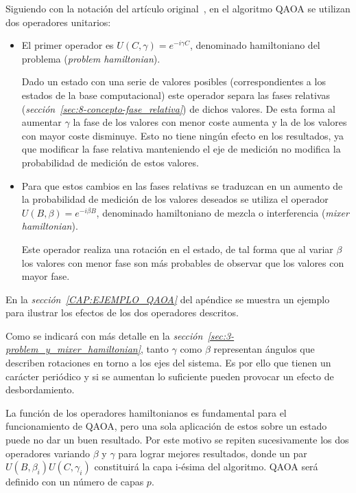 Siguiendo con la notación del artículo original~\cite{qaoa_paper_original}, en el algoritmo QAOA se utilizan dos operadores unitarios:
\begin{itemize}
\item El primer operador es $U(C, \gamma) = e^{-i \gamma C}$, denominado hamiltoniano del problema (\textit{problem hamiltonian}).

  Dado un estado con una serie de valores posibles (correspondientes a los estados de la base computacional) este operador separa las fases relativas (\textit{sección~\ref{sec:8-concepto-fase_relativa}}) de dichos valores.
  De esta forma al aumentar $\gamma$ la fase de los valores con menor coste aumenta y la de los valores con mayor coste disminuye.
  Esto no tiene ningún efecto en los resultados, ya que modificar la fase relativa manteniendo el eje de medición no modifica la probabilidad de medición de estos valores.

\item Para que estos cambios en las fases relativas se traduzcan en un aumento de la probabilidad de medición de los valores deseados se utiliza el operador $U(B, \beta) = e^{-i \beta B}$, denominado hamiltoniano de mezcla o interferencia (\textit{mixer hamiltonian}).

  Este operador realiza una rotación en el estado, de tal forma que al variar $\beta$ los valores con menor fase son más probables de observar que los valores con mayor fase.

\end{itemize}

En la \textit{sección~\ref{CAP:EJEMPLO_QAOA}} del apéndice se muestra un ejemplo para ilustrar los efectos de los dos operadores descritos.

Como se indicará con más detalle en la \textit{sección~\ref{sec:3-problem_y_mixer_hamiltonian}}, tanto $\gamma$ como $\beta$ representan ángulos que describen rotaciones en torno a los ejes del sistema.
Es por ello que tienen un carácter periódico y si se aumentan lo suficiente pueden provocar un efecto de desbordamiento.

La función de los operadores hamiltonianos es fundamental para el funcionamiento de QAOA, pero una sola aplicación de estos sobre un estado puede no dar un buen resultado.
Por este motivo se repiten sucesivamente los dos operadores variando $\beta$ y $\gamma$ para lograr mejores resultados, donde un par $U(B, \beta_i)U(C, \gamma_i)$ constituirá la capa i-ésima del algoritmo.
QAOA será definido con un número de capas $p$.


